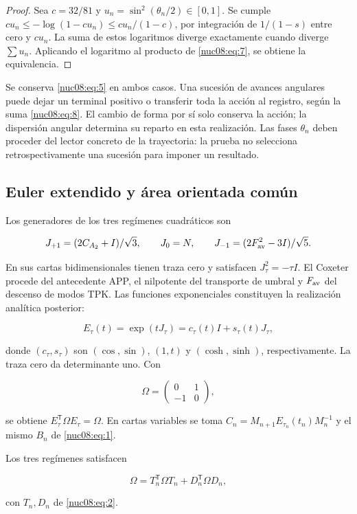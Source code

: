 \begin{proof}
Sea \(c=32/81\) y \(u_n=\sin^2(\theta_n/2)\in[0,1]\). Se cumple
\(cu_n\leq-\log(1-cu_n)\leq cu_n/(1-c)\), por integración de \(1/(1-s)\) entre cero y \(cu_n\). La suma de estos logaritmos diverge exactamente cuando diverge \(\sum u_n\). Aplicando el logaritmo al producto de \eqref{nuc08:eq:7}, se obtiene la equivalencia.
\end{proof}

Se conserva \eqref{nuc08:eq:5} en ambos casos. Una sucesión de avances angulares puede dejar un terminal positivo o transferir toda la acción al registro, según la suma \eqref{nuc08:eq:8}. El cambio de forma por sí solo conserva la acción; la dispersión angular determina su reparto en esta realización. Las fases \(\theta_n\) deben proceder del lector concreto de la trayectoria: la prueba no selecciona retrospectivamente una sucesión para imponer un resultado.

\subsection{Euler extendido y área orientada común}

Los generadores de los tres regímenes cuadráticos son

\[
J_{+1}=(2C_{A_2}+I)/\sqrt3,\qquad
J_0=N,\qquad
J_{-1}=(2F_{\rm av}^2-3I)/\sqrt5.
\]

En sus cartas bidimensionales tienen traza cero y satisfacen
\(J_\tau^2=-\tau I\). El Coxeter procede del antecedente APP, el nilpotente del transporte de umbral y \(F_{\rm av}\) del descenso de modos TPK. Las funciones exponenciales constituyen la realización analítica posterior:

\[
E_\tau(t)=\exp(tJ_\tau)=c_\tau(t)I+s_\tau(t)J_\tau,
\]

donde \((c_\tau,s_\tau)\) son \((\cos,\sin)\), \((1,t)\) y \((\cosh,\sinh)\), respectivamente. La traza cero da determinante uno. Con

\[
\Omega=\begin{pmatrix}0&1\\-1&0\end{pmatrix},
\]

se obtiene \(E_\tau^\mathsf T\Omega E_\tau=\Omega\). En cartas variables se toma
\(C_n=M_{n+1}E_{\tau_n}(t_n)M_n^{-1}\) y el mismo \(B_n\) de \eqref{nuc08:eq:1}.

\begin{theorem}
Los tres regímenes satisfacen

\begin{equation}
\boxed{\Omega=T_n^\mathsf T\Omega T_n+D_n^\mathsf T\Omega D_n,}
\label{nuc08:eq:9}
\end{equation}

con \(T_n,D_n\) de \eqref{nuc08:eq:2}.
\end{theorem}

